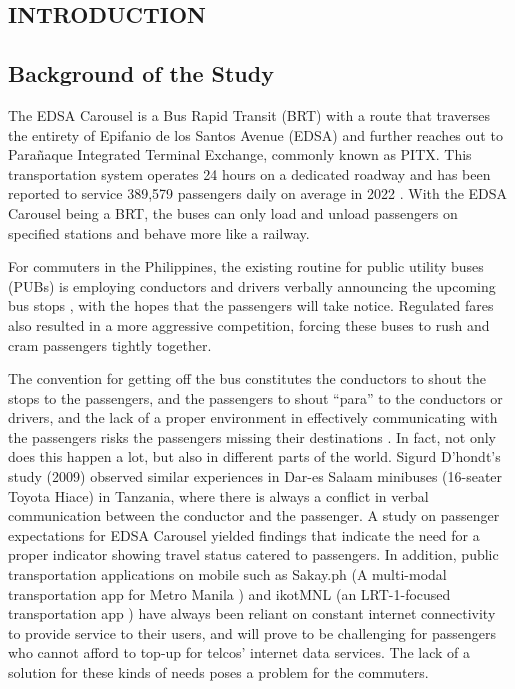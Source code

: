 \documentclass{icsthesis}
\begin{document}
	\begin{mainmatter}
		\section{INTRODUCTION}
\subsection{Background of the Study}
The EDSA Carousel is a Bus Rapid Transit (BRT) with a route that traverses the entirety of Epifanio de los Santos Avenue (EDSA) and further reaches out to Parañaque Integrated Terminal Exchange, commonly known as PITX. This transportation system operates 24 hours on a dedicated roadway and has been reported to service 389,579 passengers daily on average in 2022 \citep{Ref:006}. With the EDSA Carousel being a BRT, the buses can only load and unload passengers on specified stations and behave more like a railway.

For commuters in the Philippines, the existing routine for public utility buses (PUBs) is employing conductors and drivers verbally announcing the upcoming bus stops \citep{Ref:004}, with the hopes that the passengers will take notice. Regulated fares also resulted in a more aggressive competition, forcing these buses to rush and cram passengers tightly together.

The convention for getting off the bus constitutes the conductors to shout the stops to the passengers, and the passengers to shout “para” to the conductors or drivers, and the lack of a proper environment in effectively communicating with the passengers risks the passengers missing their destinations \citep{Ref:002}.  In fact, not only does this happen a lot, but also in different parts of the world. Sigurd D’hondt’s study (2009) observed similar experiences in Dar-es Salaam minibuses (16-seater Toyota Hiace) in Tanzania, where there is always a conflict in verbal communication between the conductor and the passenger.
A study on passenger expectations for EDSA Carousel \citep{Ref:001} yielded findings that indicate the need for a proper indicator showing travel status catered to passengers. In addition, public transportation applications on mobile such as Sakay.ph (A multi-modal transportation app for Metro Manila \citep{Ref:015}) and ikotMNL (an LRT-1-focused transportation app \citep{Ref:008}) have always been reliant on constant internet connectivity to provide service to their users, and will prove to be challenging for passengers who cannot afford to top-up for telcos’ internet data services. The lack of a solution for these kinds of needs poses a problem for the commuters.



\end{mainmatter}
\end{document}

